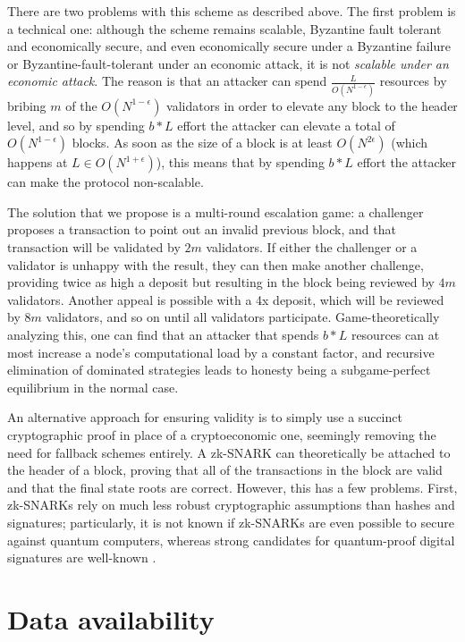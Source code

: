 \documentclass[11pt,a4paper]{report}
\theoremstyle{plain}
\theoremstyle{definition}
\theoremstyle{remark}
\begin{document}
There are two problems with this scheme as described above. The first problem is a technical one: although the scheme remains scalable, Byzantine fault tolerant and economically secure, and even economically secure under a Byzantine failure or Byzantine-fault-tolerant under an economic attack, it is not \emph{scalable under an economic attack}. The reason is that an attacker can spend $\frac{L}{O(N^{1-\epsilon})}$ resources by bribing $m$ of the $O(N^{1-\epsilon})$ validators in order to elevate any block to the header level, and so by spending $b * L$ effort the attacker can elevate a total of $O(N^{1-\epsilon})$ blocks. As soon as the size of a block is at least $O(N^{2\epsilon})$ (which happens at $L \in O(N^{1+\epsilon})$), this means that by spending $b * L$ effort the attacker can make the protocol non-scalable.

The solution that we propose is a multi-round escalation game: a challenger proposes a transaction to point out an invalid previous block, and that transaction will be validated by $2m$ validators. If either the challenger or a validator is unhappy with the result, they can then make another challenge, providing twice as high a deposit but resulting in the block being reviewed by $4m$ validators. Another appeal is possible with a 4x deposit, which will be reviewed by $8m$ validators, and so on until all validators participate. Game-theoretically analyzing this, one can find that an attacker that spends $b * L$ resources can at most increase a node's computational load by a constant factor, and recursive elimination of dominated strategies leads to honesty being a subgame-perfect equilibrium in the normal case.

An alternative approach for ensuring validity is to simply use a succinct cryptographic proof in place of a cryptoeconomic one, seemingly removing the need for fallback schemes entirely. A zk-SNARK can theoretically be attached to the header of a block, proving that all of the transactions in the block are valid and that the final state roots are correct. However, this has a few problems. First, zk-SNARKs rely on much less robust cryptographic assumptions than hashes and signatures; particularly, it is not known if zk-SNARKs are even possible to secure against quantum computers, whereas strong candidates for quantum-proof digital signatures are well-known \citep{bernstein_sphincs:_2014, gluck_hash_2014, hoffstein_ntrusign:_2003}.

\chapter{Data availability}
\end{document}

